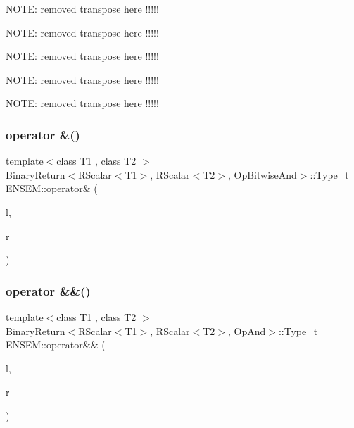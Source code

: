 N\+O\+TE\+: removed transpose here !!!!!

N\+O\+TE\+: removed transpose here !!!!!

N\+O\+TE\+: removed transpose here !!!!!

N\+O\+TE\+: removed transpose here !!!!!

N\+O\+TE\+: removed transpose here !!!!! \mbox{\label{group__rscalar_ga389f96c37c3b933acfc68be93291ae0e}} 
\subsubsection{\texorpdfstring{operator \&()}{operator \&()}}
{\footnotesize\ttfamily template$<$class T1 , class T2 $>$ \\
\mbox{\hyperlink{structENSEM_1_1BinaryReturn}{Binary\+Return}}$<$\mbox{\hyperlink{classENSEM_1_1RScalar}{R\+Scalar}}$<$T1$>$, \mbox{\hyperlink{classENSEM_1_1RScalar}{R\+Scalar}}$<$T2$>$, \mbox{\hyperlink{structENSEM_1_1OpBitwiseAnd}{Op\+Bitwise\+And}}$>$\+::Type\+\_\+t E\+N\+S\+E\+M\+::operator\& (\begin{DoxyParamCaption}\item[{const \mbox{\hyperlink{classENSEM_1_1RScalar}{R\+Scalar}}$<$ T1 $>$ \&}]{l,  }\item[{const \mbox{\hyperlink{classENSEM_1_1RScalar}{R\+Scalar}}$<$ T2 $>$ \&}]{r }\end{DoxyParamCaption})\hspace{0.3cm}{\ttfamily [inline]}}

\mbox{\label{group__rscalar_ga142a7a22c88f64f590411925c5c3cdcd}} 
\subsubsection{\texorpdfstring{operator \&\&()}{operator \&\&()}}
{\footnotesize\ttfamily template$<$class T1 , class T2 $>$ \\
\mbox{\hyperlink{structENSEM_1_1BinaryReturn}{Binary\+Return}}$<$\mbox{\hyperlink{classENSEM_1_1RScalar}{R\+Scalar}}$<$T1$>$, \mbox{\hyperlink{classENSEM_1_1RScalar}{R\+Scalar}}$<$T2$>$, \mbox{\hyperlink{structENSEM_1_1OpAnd}{Op\+And}}$>$\+::Type\+\_\+t E\+N\+S\+E\+M\+::operator\&\& (\begin{DoxyParamCaption}\item[{const \mbox{\hyperlink{classENSEM_1_1RScalar}{R\+Scalar}}$<$ T1 $>$ \&}]{l,  }\item[{const \mbox{\hyperlink{classENSEM_1_1RScalar}{R\+Scalar}}$<$ T2 $>$ \&}]{r }\end{DoxyParamCaption})\hspace{0.3cm}{\ttfamily [inline]}}

